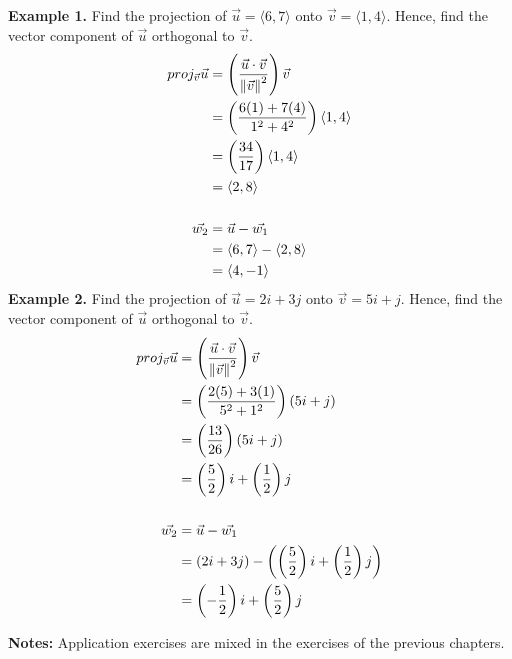 \newpage
\noindent\textbf{Example 1. } Find the projection of $\vec{u} = \langle 6, 7 \rangle$ onto $\vec{v} = \langle 1, 4 \rangle$. Hence, find the vector component of $\vec{u}$ orthogonal to $\vec{v}$.
\begin{align*}
    proj_{\vec{v}}\vec{u} & = \left(\frac{\vec{u} \cdot \vec{v}}{\left\lVert\vec{v}\right\rVert^2}\right)\vec{v} \\
                          & = \left(\frac{6(1) + 7(4)}{1^2 + 4^2}\right)\langle 1, 4 \rangle     \\
                          & = \left(\frac{34}{17}\right)\langle 1, 4 \rangle                     \\
                          & = \langle 2, 8 \rangle                                               \\
    \\
    \vec{w_2}             & = \vec{u} - \vec{w_1}                                                \\
                          & = \langle 6, 7 \rangle - \langle 2, 8 \rangle                        \\
                          & = \langle 4, -1 \rangle
\end{align*}
\noindent\textbf{Example 2. } Find the projection of $\vec{u} = 2i + 3j$ onto $\vec{v} = 5i + j$. Hence, find the vector component of $\vec{u}$ orthogonal to $\vec{v}$.
\begin{align*}
    proj_{\vec{v}}\vec{u} & = \left(\frac{\vec{u} \cdot \vec{v}}{\left\lVert\vec{v}\right\rVert^2}\right)\vec{v}             \\
                          & = \left(\frac{2(5) + 3(1)}{5^2 + 1^2}\right)(5i + j)                             \\
                          & = \left(\frac{13}{26}\right)(5i + j)                                             \\
                          & = \left(\frac{5}{2}\right)i + \left(\frac{1}{2}\right)j                          \\
    \\
    \vec{w_2}             & = \vec{u} - \vec{w_1}                                                            \\
                          & = (2i + 3j) - \left(\left(\frac{5}{2}\right)i + \left(\frac{1}{2}\right)j\right) \\
                          & = \left(-\frac{1}{2}\right)i + \left(\frac{5}{2}\right)j
\end{align*}

\noindent\textbf{Notes:} Application exercises are mixed in the exercises of the previous chapters.